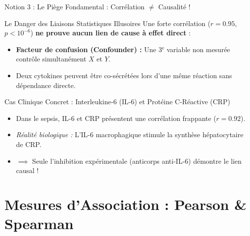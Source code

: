 \documentclass[aspectratio=169,10pt]{beamer}
\begin{document}
\begin{frame}{Notion 3 : Le Piège Fondamental : Corrélation $\neq$ Causalité !}
  \begin{warnbox}{Le Danger des Liaisons Statistiques Illusoires}
    \footnotesize
    Une forte corrélation ($r = 0.95$, $p < 10^{-6}$) \textbf{ne prouve aucun lien de cause à effet direct} :
    \begin{itemize}
      \item \textbf{Facteur de confusion (Confounder) :} Une 3$^{\text{e}}$ variable non mesurée contrôle simultanément $X$ et $Y$.
      \item Deux cytokines peuvent être co-sécrétées lors d'une même réaction sans dépendance directe.
    \end{itemize}
  \end{warnbox}
  \vspace{1mm}
  \begin{biobox}{Cas Clinique Concret : Interleukine-6 (IL-6) et Protéine C-Réactive (CRP)}
    \footnotesize
    \begin{itemize}
      \item Dans le sepsis, IL-6 et CRP présentent une corrélation frappante ($r = 0.92$).
      \item \textit{Réalité biologique :} L'IL-6 macrophagique stimule la synthèse hépatocytaire de CRP.
      \item $\implies$ Seule l'inhibition expérimentale (anticorps anti-IL-6) démontre le lien causal !
    \end{itemize}
  \end{biobox}
\end{frame}

\section{Mesures d'Association : Pearson \& Spearman}
\end{document}
